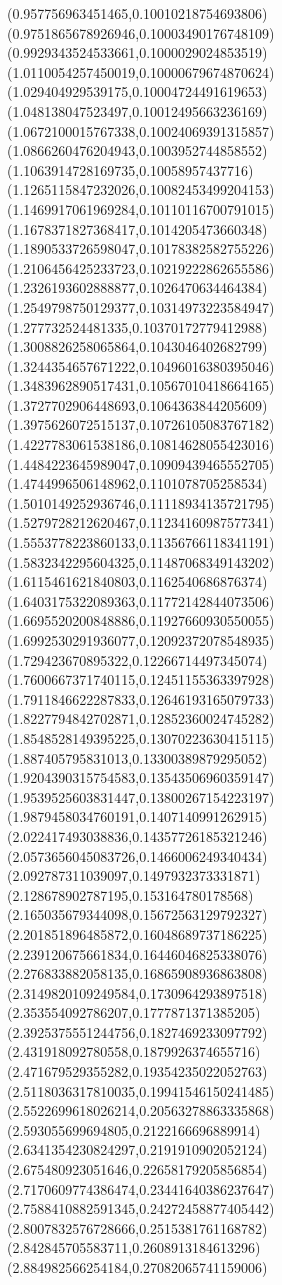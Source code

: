 {(0.957756963451465,0.10010218754693806)
(0.9751865678926946,0.10003490176748109)
(0.9929343524533661,0.1000029024853519)
(1.0110054257450019,0.10000679674870624)
(1.029404929539175,0.10004724491619653)
(1.048138047523497,0.10012495663236169)
(1.0672100015767338,0.10024069391315857)
(1.0866260476204943,0.1003952744858552)
(1.1063914728169735,0.10058957437716)
(1.1265115847232026,0.10082453499204153)
(1.1469917061969284,0.10110116700791015)
(1.1678371827368417,0.1014205473660348)
(1.1890533726598047,0.10178382582755226)
(1.2106456425233723,0.10219222862655586)
(1.2326193602888877,0.1026470634464384)
(1.2549798750129377,0.10314973223584947)
(1.277732524481335,0.10370172779412988)
(1.3008826258065864,0.1043046402682799)
(1.3244354657671222,0.10496016380395046)
(1.3483962890517431,0.10567010418664165)
(1.3727702906448693,0.1064363844205609)
(1.3975626072515137,0.10726105083767182)
(1.4227783061538186,0.10814628055423016)
(1.4484223645989047,0.10909439465552705)
(1.4744996506148962,0.1101078705258534)
(1.5010149252936746,0.11118934135721795)
(1.5279728212620467,0.11234160987577341)
(1.5553778223860133,0.11356766118341191)
(1.5832342295604325,0.11487068349143202)
(1.6115461621840803,0.1162540686876374)
(1.6403175322089363,0.11772142844073506)
(1.6695520200848886,0.11927660930550055)
(1.6992530291936077,0.12092372078548935)
(1.729423670895322,0.12266714497345074)
(1.7600667371740115,0.12451155363397928)
(1.7911846622287833,0.12646193165079733)
(1.8227794842702871,0.12852360024745282)
(1.8548528149395225,0.13070223630415115)
(1.887405795831013,0.13300389879295052)
(1.9204390315754583,0.13543506960359147)
(1.9539525603831447,0.13800267154223197)
(1.9879458034760191,0.1407140991262915)
(2.022417493038836,0.14357726185321246)
(2.0573656045083726,0.1466006249340434)
(2.092787311039097,0.1497932373331871)
(2.128678902787195,0.153164780178568)
(2.165035679344098,0.15672563129792327)
(2.201851896485872,0.16048689737186225)
(2.239120675661834,0.16446046825338076)
(2.276833882058135,0.16865908936863808)
(2.3149820109249584,0.1730964293897518)
(2.353554092786207,0.1777871371385205)
(2.3925375551244756,0.1827469233097792)
(2.431918092780558,0.1879926374655716)
(2.471679529355282,0.19354235022052763)
(2.5118036317810035,0.19941546150241485)
(2.5522699618026214,0.20563278863335868)
(2.593055699694805,0.2122166696889914)
(2.6341354230824297,0.2191910902052124)
(2.675480923051646,0.22658179205856854)
(2.7170609774386474,0.23441640386237647)
(2.7588410882591345,0.24272458877405442)
(2.8007832576728666,0.2515381761168782)
(2.842845705583711,0.2608913184613296)
(2.884982566254184,0.27082065741159006)
}
